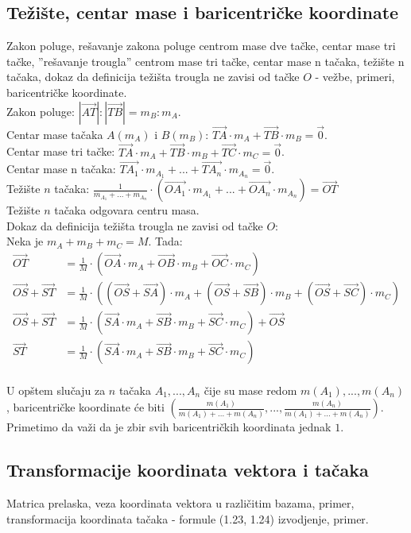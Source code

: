 \documentclass[12pt]{article}
\newcommand{\vek}[1]{\overrightarrow{#1}}
\begin{document}
\subsection{Težište, centar mase i baricentričke koordinate}
Zakon poluge, rešavanje zakona poluge centrom mase dve tačke, centar
mase tri tačke, ”rešavanje trougla” centrom mase tri tačke, centar
mase n tačaka, težište n tačaka, dokaz da definicija težišta trougla
ne zavisi od tačke $O$ - vežbe, primeri, baricentričke koordinate.
\\[1cm]
Zakon poluge: $|\vek{AT}|:|\vek{TB}|=m_B:m_A$.\\
Centar mase tačaka $A(m_A)$ i $B(m_B)$: $\vek{TA}\cdot m_A+\vek{TB}\cdot m_B=\vek{0}$.\\
Centar mase tri tačke: $\vek{TA}\cdot m_A+\vek{TB}\cdot m_B+\vek{TC}\cdot m_C=\vek{0}$.\\
Centar mase n tačaka: $\vek{TA_1}\cdot m_{A_1}+...+\vek{TA_n}\cdot m_{A_n}=\vek{0}$.\\
Težište $n$ tačaka: $\frac{1}{m_{A_1}+...+m_{A_n}}\cdot(\vek{OA_1}\cdot m_{A_1}+...+\vek{OA_n}\cdot m_{A_n})=\vek{OT}$\\
Težište $n$ tačaka odgovara centru masa.\\
Dokaz da definicija težišta trougla ne zavisi od tačke $O$:\\
Neka je $m_{A}+m_{B}+m_{C}=M$. Tada:
\begin{align*}
    \vek{OT}          & =\frac{1}{M}\cdot(\vek{OA}\cdot m_{A}+\vek{OB}\cdot m_{B}+\vek{OC}\cdot m_{C})                                  \\
    \vek{OS}+\vek{ST} & =\frac{1}{M}\cdot((\vek{OS}+\vek{SA})\cdot m_{A}+(\vek{OS}+\vek{SB})\cdot m_{B}+(\vek{OS}+\vek{SC})\cdot m_{C}) \\
    \vek{OS}+\vek{ST} & =\frac{1}{M}\cdot(\vek{SA}\cdot m_{A}+\vek{SB}\cdot m_{B}+\vek{SC}\cdot m_{C})+\vek{OS}                         \\
    \vek{ST}          & =\frac{1}{M}\cdot(\vek{SA}\cdot m_{A}+\vek{SB}\cdot m_{B}+\vek{SC}\cdot m_{C})
\end{align*}\\
U opštem slučaju za $n$ tačaka $A_1,...,A_n$ čije su mase redom $m(A_1),...,m(A_n)$, baricentričke koordinate će biti
$(\frac{m(A_1)}{m(A_1)+...+m(A_n)},...,\frac{m(A_n)}{m(A_1)+...+m(A_n)})$. Primetimo da važi da je zbir svih baricentričkih
koordinata jednak $1$.


\subsection{Transformacije koordinata vektora i tačaka}
Matrica prelaska, veza koordinata vektora u različitim bazama,
primer, transformacija koordinata tačaka - formule (1.23, 1.24)
izvodjenje, primer.\par
\end{document}
